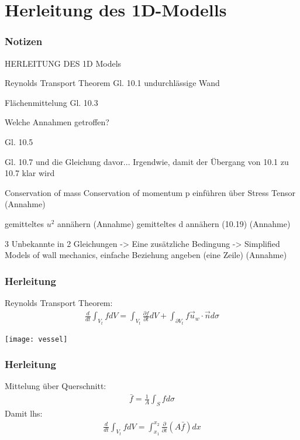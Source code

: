 \section{Herleitung des 1D-Modells}

\begin{frame}
\frametitle{Notizen}

HERLEITUNG DES 1D Models

Reynolds Transport Theorem Gl. 10.1
  undurchlässige Wand

Flächenmittelung Gl. 10.3

Welche Annahmen getroffen?

Gl. 10.5

Gl. 10.7 und die Gleichung davor... Irgendwie, damit der Übergang von
10.1 zu 10.7 klar wird

Conservation of mass
Conservation of momentum
  p einführen über Stress Tensor (Annahme)

gemitteltes $u^2$ annähern (Annahme)
gemitteltes d annähern (10.19) (Annahme)

3 Unbekannte in 2 Gleichungen -> Eine zusätzliche Bedingung -> Simplified
Models of wall mechanics, einfache Beziehung angeben (eine Zeile) (Annahme)



\end{frame}


\begin{frame}\frametitle{Herleitung}

  Reynolds Transport Theorem:
  \begin{align}
    \frac{d}{dt} \int_{V_t} f dV = \int_{V_t} \frac{\partial f}{\partial t}dV + \int_{\partial V_t} f \vec u_w \cdot \vec n d\sigma \label{10.1} %
  \end{align}

  \begin{center}
      \texttt{[image: vessel]}
  \end{center}

\end{frame}


\begin{frame}\frametitle{Herleitung}

  Mittelung über Querschnitt:
  \begin{align}
    \bar f = \frac{1}{A} \int_S f d\sigma %
  \end{align}
  Damit lhs:
  \begin{align}
    \frac{d}{dt} \int_{V_t} f dV = \int_{x_1}^{x_2} \frac{\partial}{\partial t} (A \bar f) dx %
  \end{align}

\end{frame}


